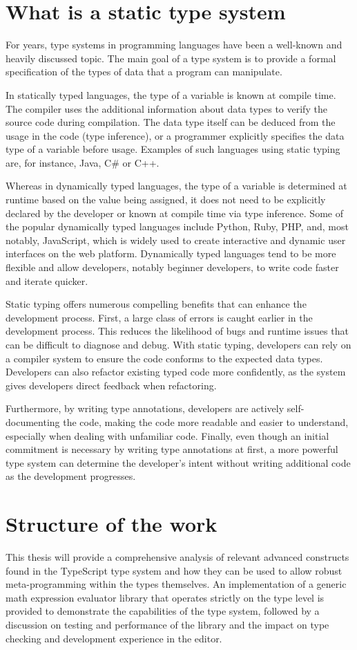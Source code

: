\section{What is a static type system}

For years, type systems in programming languages have been a well-known and heavily discussed topic. The main goal of a type system is to provide a formal specification of the types of data that a program can manipulate.

In statically typed languages, the type of a variable is known at compile time. The compiler uses the additional information about data types to verify the source code during compilation. The data type itself can be deduced from the usage in the code (type inference), or a programmer explicitly specifies the data type of a variable before usage. Examples of such languages using static typing are, for instance, Java, C\# or C++.

Whereas in dynamically typed languages, the type of a variable is determined at runtime based on the value being assigned, it does not need to be explicitly declared by the developer or known at compile time via type inference. Some of the popular dynamically typed languages include Python, Ruby, PHP, and, most notably, JavaScript, which is widely used to create interactive and dynamic user interfaces on the web platform. Dynamically typed languages tend to be more flexible and allow developers, notably beginner developers, to write code faster and iterate quicker.

Static typing offers numerous compelling benefits that can enhance the development process. First, a large class of errors is caught earlier in the development process. This reduces the likelihood of bugs and runtime issues that can be difficult to diagnose and debug. With static typing, developers can rely on a compiler system to ensure the code conforms to the expected data types. Developers can also refactor existing typed code more confidently, as the system gives developers direct feedback when refactoring.

Furthermore, by writing type annotations, developers are actively self-documenting the code, making the code more readable and easier to understand, especially when dealing with unfamiliar code. Finally, even though an initial commitment is necessary by writing type annotations at first, a more powerful type system can determine the developer's intent without writing additional code as the development progresses.

\section{Structure of the work}

This thesis will provide a comprehensive analysis of relevant advanced constructs found in the TypeScript type system and how they can be used to allow robust meta-programming within the types themselves. An implementation of a generic math expression evaluator library that operates strictly on the type level is provided to demonstrate the capabilities of the type system, followed by a discussion on testing and performance of the library and the impact on type checking and development experience in the editor.

